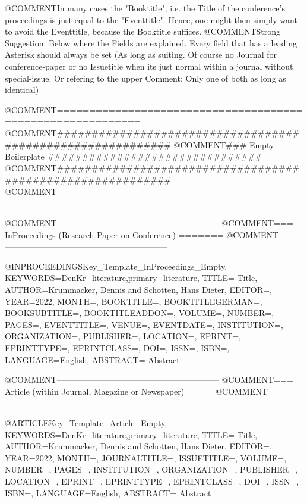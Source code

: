 
@COMMENT{In many cases the "Booktitle", i.e. the Title of the conference's proceedings is just equal to the "Eventtitle". Hence, one might then simply want to avoid the Eventtitle, because the Booktitle suffices.}
@COMMENT{Strong Suggestion: Below where the Fields are explained. Every field that has a leading Asterisk should always be set (As long as suiting. Of course no Journal for conference-paper or no Issuetitle when its just normal within a journal without special-issue. Or refering to the upper Comment: Only one of both as long as identical)}




@COMMENT{===========================================================}
@COMMENT{###########################################################}
@COMMENT{###    Empty Boilerplate    ###############################}
@COMMENT{###########################################################}
@COMMENT{===========================================================}


@COMMENT{-----------------------------------------------------------}
@COMMENT{===  InProceedings  (Research Paper on Conference)  =======}
@COMMENT{-----------------------------------------------------------}

@INPROCEEDINGS{Key_Template_InProceedings_Empty,
    KEYWORDS={DenKr_literature,primary_literature},
    TITLE={\begingroup
        Title\endgroup},
    AUTHOR={Krummacker, Dennis and Schotten, Hans Dieter},
    EDITOR={},
    YEAR={2022},
    MONTH={},
    BOOKTITLE={},
    BOOKTITLEGERMAN={},
    BOOKSUBTITLE={},
    BOOKTITLEADDON={},
    VOLUME={},
    NUMBER={},
    PAGES={},
    EVENTTITLE={},
    VENUE={},
    EVENTDATE={},
    INSTITUTION={},
    ORGANIZATION={},
    PUBLISHER={},
    LOCATION={},
    EPRINT={},
    EPRINTTYPE={},
    EPRINTCLASS={},
    DOI={},
    ISSN={},
    ISBN={},
    LANGUAGE={English},
    ABSTRACT={\begingroup
        Abstract\endgroup}
}



@COMMENT{-----------------------------------------------------------}
@COMMENT{===  Article  (within Journal, Magazine or Newspaper)  ====}
@COMMENT{-----------------------------------------------------------}

@ARTICLE{Key_Template_Article_Empty,
    KEYWORDS={DenKr_literature,primary_literature},
    TITLE={\begingroup
        Title\endgroup},
    AUTHOR={Krummacker, Dennis and Schotten, Hans Dieter},
    EDITOR={},
    YEAR={2022},
    MONTH={},
    JOURNALTITLE={},
    ISSUETITLE={},
    VOLUME={},
    NUMBER={},
    PAGES={},
    INSTITUTION={},
    ORGANIZATION={},
    PUBLISHER={},
    LOCATION={},
    EPRINT={},
    EPRINTTYPE={},
    EPRINTCLASS={},
    DOI={},
    ISSN={},
    ISBN={},
    LANGUAGE={English},
    ABSTRACT={\begingroup
        Abstract\endgroup}
}










